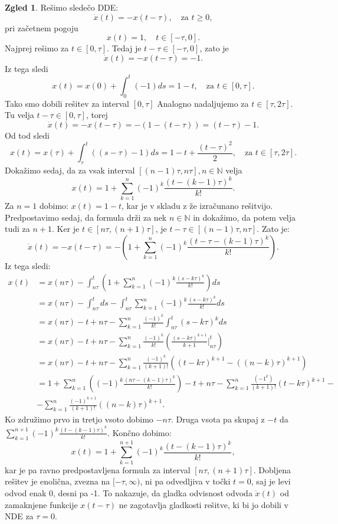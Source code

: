 \documentclass[12pt,a4paper]{amsart}
\theoremstyle{definition} %
\newtheorem{zgled}[definicija]{Zgled}
\theoremstyle{plain} %
\newcommand{\N}{\mathbb N}
\begin{document}
\begin{zgled}
    Rešimo sledečo DDE:
    \[\dot{x}(t)=-x(t-\tau), \quad \text{za } t \geq 0,\]
    pri začetnem pogoju \[x(t)=1, \quad t \in [-\tau,0].\]
    Najprej rešimo za $t \in [0,\tau]$. Tedaj je $t-\tau \in [-\tau,0]$, zato je
    \[\dot{x}(t)=-x(t-\tau)=-1.\]
    Iz tega sledi
    \[x(t)=x(0)+ \int_{0}^{t}(-1)ds = 1-t, \quad \text{za } t \in [0,\tau].\]
    Tako smo dobili rešitev za interval $[0,\tau]$
    Analogno nadaljujemo za $t \in [\tau, 2\tau]$. Tu velja $t-\tau \in [0,\tau]$, torej
    \[\dot{x}(t)=-x(t-\tau)=-(1-(t-\tau))=(t-\tau)-1.\]
    Od tod sledi
    \[x(t)=x(\tau)+\int_{\tau}^{t}((s-\tau)-1)ds=1-t+\frac{(t-\tau)^2}{2},\quad \text{za }t\in[\tau,2\tau].\]
    Dokažimo sedaj, da za vsak interval $[(n-1)\tau,n\tau], n\in \N$ velja
    \[x(t)=1+\sum_{k=1}^{n}(-1)^k\frac{(t-(k-1)\tau)^k}{k!}.\]
    Za $n=1$ dobimo: $x(t)=1-t$, kar je v skladu z že izračunano rešitvijo.
    Predpostavimo sedaj, da formula drži za nek $n \in \N$ in dokažimo, da potem velja tudi za $n+1$.
    Ker je $t \in [n\tau,(n+1)\tau]$, je $t-\tau \in [(n-1)\tau, n\tau]$. Zato je:
    \[ \dot{x}(t)=-x(t-\tau)=-\left(1+\sum_{k=1}^{n}(-1)^k\frac{(t-\tau-(k-1)\tau)^k}{k!}\right).\]
    Iz tega sledi:
    \begin{equation*}
    \begin{split}
        x(t) &= x(n\tau) - \int_{n\tau}^{t}\left(1+\sum_{k=1}^{n}(-1)^k\frac{(s-k\tau)^k}{k!}\right)ds \\
        & = x(n\tau) - \int_{n\tau}^{t}ds - \int_{n\tau}^{t}\sum_{k=1}^{n}(-1)^k\frac{(s-k\tau)^k}{k!}ds \\
        & = x(n\tau) - t + n\tau - \sum_{k=1}^{n}\frac{(-1)^k}{k!}\int_{n\tau}^{t}(s-k\tau)^{k}ds \\
        & = x(n\tau) - t + n\tau - \sum_{k=1}^{n}\frac{(-1)^k}{k!}\left(\frac{(s-k\tau)^{k+1}}{k+1}\Bigr|_{n\tau}^{t}\right) \\
        & = x(n\tau) - t + n\tau - \sum_{k=1}^{n}\frac{(-1)^k}{(k+1)!}\left((t-k\tau)^{k+1}-((n-k)\tau)^{k+1}\right) \\
        & = 1 + \sum_{k=1}^{n}\left((-1)^k\frac{(n\tau-(k-1)\tau)^k}{k!}\right)- t + n\tau - \sum_{k=1}^{n}\frac{(-1^k)}{(k+1)!}
        (t-k\tau)^{k+1} - \\
        &- \sum_{k=1}^{n}\frac{(-1)^{k+1}}{(k+1)!}((n-k)\tau)^{k+1}.
    \end{split}      
    \end{equation*}
    Ko združimo prvo in tretjo vsoto dobimo $-n\tau$. Druga vsota pa skupaj z $-t$ da
     $\sum_{k=1}^{n+1}(-1)^{k}\frac{(t-(k-1)\tau)^k}{k!}$. Končno dobimo:
     \[x(t) = 1+ \sum_{k=1}^{n+1}(-1)^{k}\frac{(t-(k-1)\tau)^k}{k!},\]
    kar je pa ravno predpostavljena formula za interval $[n\tau, (n+1)\tau].$
    Dobljena rešitev je enolična, zvezna na $[-\tau,\infty)$, ni pa odvedljiva v točki $t=0$, saj je 
    levi odvod enak 0, desni pa -1. To nakazuje, da gladka odvisnost odvoda $\dot{x}(t)$ od zamaknjene
    funkcije $x(t-\tau)$
    ne zagotavlja gladkosti rešitve, ki bi jo dobili
    v NDE za $\tau=0$. %
\end{zgled}
\end{document}
